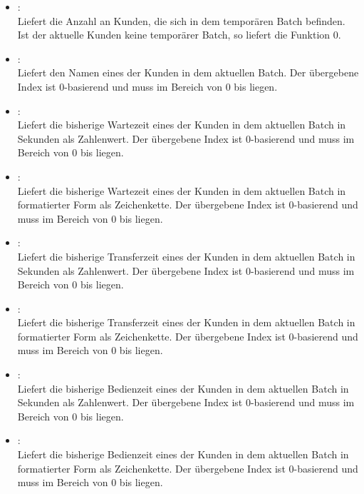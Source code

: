 \begin{itemize}
\item
{}:\\
Liefert die Anzahl an Kunden, die sich in dem temporären Batch befinden.
Ist der aktuelle Kunden keine temporärer Batch, so liefert die Funktion 0.

\item
{}:\\
Liefert den Namen eines der Kunden in dem aktuellen Batch.
Der übergebene Index ist 0-basierend und muss im Bereich von 0 bis  liegen.

\item
{}:\\
Liefert die bisherige Wartezeit eines der Kunden in dem aktuellen Batch in Sekunden als Zahlenwert.
Der übergebene Index ist 0-basierend und muss im Bereich von 0 bis  liegen.

\item
{}:\\
Liefert die bisherige Wartezeit eines der Kunden in dem aktuellen Batch in formatierter Form als Zeichenkette.
Der übergebene Index ist 0-basierend und muss im Bereich von 0 bis  liegen.

\item
{}:\\
Liefert die bisherige Transferzeit eines der Kunden in dem aktuellen Batch in Sekunden als Zahlenwert.
Der übergebene Index ist 0-basierend und muss im Bereich von 0 bis  liegen.

\item
{}:\\
Liefert die bisherige Transferzeit eines der Kunden in dem aktuellen Batch in formatierter Form als Zeichenkette.
Der übergebene Index ist 0-basierend und muss im Bereich von 0 bis  liegen.

\item
{}:\\
Liefert die bisherige Bedienzeit eines der Kunden in dem aktuellen Batch in Sekunden als Zahlenwert.
Der übergebene Index ist 0-basierend und muss im Bereich von 0 bis  liegen.

\item
{}:\\
Liefert die bisherige Bedienzeit eines der Kunden in dem aktuellen Batch in formatierter Form als Zeichenkette.
Der übergebene Index ist 0-basierend und muss im Bereich von 0 bis  liegen.
	 

\end{itemize}
